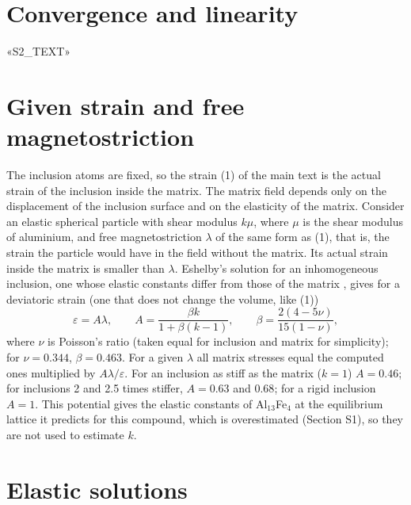 \documentclass[11pt,a4paper]{article}
\begin{document}
\section{Convergence and linearity}

«S2_TEXT»

\section{Given strain and free magnetostriction}

The inclusion atoms are fixed, so the strain (1) of the main text is
the actual strain of the inclusion inside the matrix. The matrix field depends
only on the displacement of the inclusion surface and on the elasticity of the
matrix. Consider an elastic spherical particle with shear modulus $k\mu$,
where $\mu$ is the shear modulus of aluminium, and free magnetostriction
$\lambda$ of the same form as (1), that is, the strain the particle would have
in the field without the matrix. Its actual strain inside the matrix is
smaller than $\lambda$. Eshelby's solution for an inhomogeneous inclusion, one
whose elastic constants differ from those of the matrix
\cite{Eshelby1957,Mura1987}, gives for a deviatoric strain (one that does not
change the volume, like (1))
\begin{equation}
\varepsilon=A\lambda,\qquad A=\frac{\beta k}{1+\beta(k-1)},\qquad
\beta=\frac{2(4-5\nu)}{15(1-\nu)} ,
\end{equation}
where $\nu$ is Poisson's ratio (taken equal for inclusion and matrix for
simplicity); for $\nu=0.344$, $\beta=0.463$. For a given $\lambda$ all matrix
stresses equal the computed ones multiplied by $A\lambda/\varepsilon$. For an
inclusion as stiff as the matrix ($k=1$) $A=0.46$; for inclusions 2 and 2.5 times
stiffer, $A=0.63$ and $0.68$; for a rigid inclusion $A=1$. This
potential gives the elastic constants of Al$_{13}$Fe$_4$ at the equilibrium
lattice it predicts for this compound, which is overestimated (Section S1), so
they are not used to estimate $k$.

\section{Elastic solutions}
\end{document}
